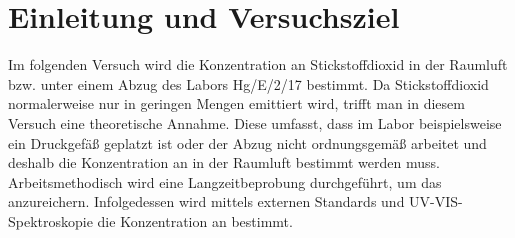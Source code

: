 \section{Einleitung und Versuchsziel}
\label{sec:aufgabenstellung}

Im folgenden Versuch wird die Konzentration an Stickstoffdioxid in der Raumluft bzw. unter einem Abzug des Labors Hg/E/2/17 bestimmt. Da Stickstoffdioxid normalerweise nur in geringen Mengen emittiert wird, trifft man in diesem Versuch eine theoretische Annahme. Diese umfasst, dass im Labor beispielsweise ein Druckgefäß geplatzt ist oder der Abzug nicht ordnungsgemäß arbeitet und deshalb die Konzentration an  in der Raumluft bestimmt werden muss.\\
Arbeitsmethodisch wird eine Langzeitbeprobung durchgeführt, um das  anzureichern. Infolgedessen wird mittels externen Standards und UV-VIS-Spektroskopie die Konzentration an  bestimmt.
